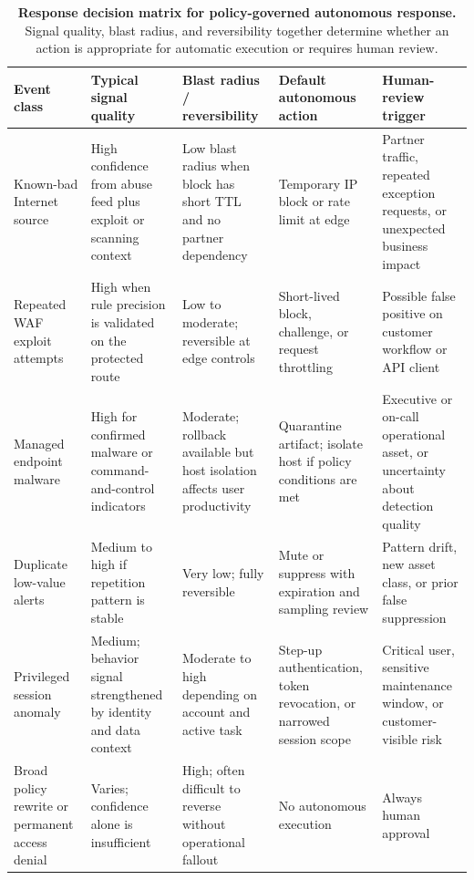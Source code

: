 \documentclass[acmlarge]{acmart}
\begin{document}
\begin{table}[t]
\caption[]{\textbf{Response decision matrix for policy-governed autonomous response.}
Signal quality, blast radius, and reversibility together determine whether an action is
appropriate for automatic execution or requires human review.}
\label{tab:decision_matrix}
\scriptsize
\setlength{\tabcolsep}{3pt}
\renewcommand{\arraystretch}{1.2}
\begin{tabular}{p{1.8cm}p{2.3cm}p{2.3cm}p{2.5cm}p{2.5cm}}
\toprule
\textbf{Event class} & \textbf{Typical signal quality} & \textbf{Blast radius / reversibility} &
\textbf{Default autonomous action} & \textbf{Human-review trigger} \\
\midrule
Known-bad Internet source & High confidence from abuse feed plus exploit or
scanning context & Low blast radius when block has short TTL and no partner
dependency & Temporary IP block or rate limit at edge &
Partner traffic, repeated exception requests, or unexpected business impact \\[4pt]
Repeated WAF exploit attempts & High when rule precision is validated on the
protected route & Low to moderate; reversible at edge controls &
Short-lived block, challenge, or request throttling &
Possible false positive on customer workflow or API client \\[4pt]
Managed endpoint malware & High for confirmed malware or command-and-control
indicators & Moderate; rollback available but host isolation affects user productivity &
Quarantine artifact; isolate host if policy conditions are met &
Executive or on-call operational asset, or uncertainty about detection quality \\[4pt]
Duplicate low-value alerts & Medium to high if repetition pattern is stable &
Very low; fully reversible &
Mute or suppress with expiration and sampling review &
Pattern drift, new asset class, or prior false suppression \\[4pt]
Privileged session anomaly & Medium; behavior signal strengthened by identity
and data context & Moderate to high depending on account and active task &
Step-up authentication, token revocation, or narrowed session scope &
Critical user, sensitive maintenance window, or customer-visible risk \\[4pt]
Broad policy rewrite or permanent access denial & Varies; confidence alone
is insufficient & High; often difficult to reverse without operational fallout &
No autonomous execution & Always human approval \\
\bottomrule
\end{tabular}
\end{table}
\end{document}
